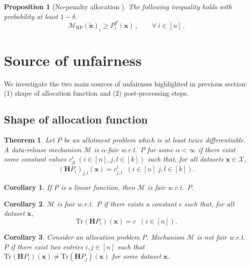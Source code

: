 \documentclass[9pt,twocolumn,twoside,lineno]{pnas-new}
\newcommand{\cM}{\mathcal{M}}
\newcommand{\cX}{\mathcal{X}}
\newcommand{\truedata}{\bm{x}}
\newcommand{\noisydata}{\tilde{\bm{x}}}
\newtheorem{corollary}{Corollary}
\newtheorem{theorem}{Theorem}
\newtheorem{proposition}{Proposition}
\newcommand{\rpmech}[1]{\cM_{\mathrm{RP}}\left(#1\right)}
\newcommand{\talloci}[1]{P^F_{#1}\left(\truedata\right)}
\begin{document}
    \begin{proposition}[No-penalty allocation \cite{pujol2020fair}]
        The following inequality holds with probability at least $1-\delta$.
        \begin{equation*}
            \rpmech{\noisydata}_i\geq \talloci{i}\,,\qquad\forall~i\in[n]\,.
        \end{equation*}
    \end{proposition}


\section*{Source of unfairness}
We investigate the two main sources of unfairness highlighted in previous section: (1) shape of allocation function and (2) post-processing steps. 
\subsection*{Shape of allocation function}

\begin{theorem}
\label{lem:fair_bound_allottments}
Let $P$ be an allotment problem which is at least twice differentiable.
A data-release mechanism $\cM$ is $\alpha$-fair w.r.t.~$P$ for some 
$\alpha < \infty$ if there exist some constant values 
$c^i_{jl} \; (i \in [n], j,l \in [k])$ such that, for all datasets $\bm{x} \in \cX$, 
\[
  (\bm{H}P_i)_{j,l}(\bm{x}) = c^i_{j,l}   \;\; (i\in[n]\; j,l\in[k]).
\]
\end{theorem}

\begin{corollary}
\label{cor:2}
If $P$ is a linear function, then $\cM$ is fair w.r.t.~$P$.
\end{corollary}


\begin{corollary}
\label{cor:3}
$\cM$ is fair w.r.t.~$P$ if there exists a constant $c$ such that,
for all dataset $\bm{x}$, 
\[
\mbox{Tr}(\bm{H}P_i)(\bm{x}) = c \;\; (i \in [n]).
\]
\end{corollary}

\begin{corollary}
Consider an allocation problem $P$. Mechanism $\cM$ is not fair
w.r.t.~$P$ if there exist two entries $i, j \in [n]$ such that
$\mbox{Tr}(\bm{H}P_i)(\bm{x}) \neq \mbox{Tr}(\bm{H}P_j)(\bm{x})$ for some dataset
$\bm{x}$.
\end{corollary}
\end{document}
